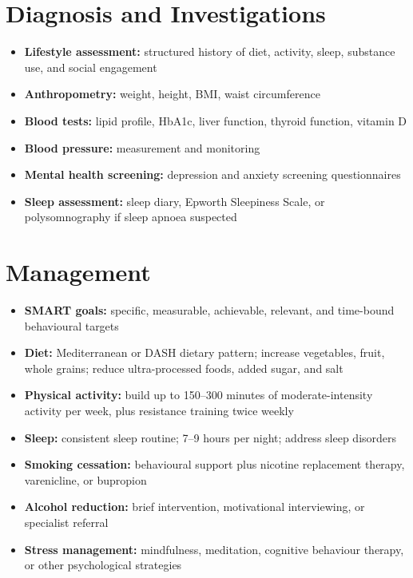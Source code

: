 \section*{Diagnosis and Investigations}
\begin{itemize}
    \item \textbf{Lifestyle assessment:} structured history of diet, activity, sleep, substance use, and social engagement
    \item \textbf{Anthropometry:} weight, height, BMI, waist circumference
    \item \textbf{Blood tests:} lipid profile, HbA1c, liver function, thyroid function, vitamin D
    \item \textbf{Blood pressure:} measurement and monitoring
    \item \textbf{Mental health screening:} depression and anxiety screening questionnaires
    \item \textbf{Sleep assessment:} sleep diary, Epworth Sleepiness Scale, or polysomnography if sleep apnoea suspected
\end{itemize}

\section*{Management}
\begin{itemize}
    \item \textbf{SMART goals:} specific, measurable, achievable, relevant, and time-bound behavioural targets
    \item \textbf{Diet:} Mediterranean or DASH dietary pattern; increase vegetables, fruit, whole grains; reduce ultra-processed foods, added sugar, and salt
    \item \textbf{Physical activity:} build up to 150--300 minutes of moderate-intensity activity per week, plus resistance training twice weekly
    \item \textbf{Sleep:} consistent sleep routine; 7--9 hours per night; address sleep disorders
    \item \textbf{Smoking cessation:} behavioural support plus nicotine replacement therapy, varenicline, or bupropion
    \item \textbf{Alcohol reduction:} brief intervention, motivational interviewing, or specialist referral
    \item \textbf{Stress management:} mindfulness, meditation, cognitive behaviour therapy, or other psychological strategies
\end{itemize}

